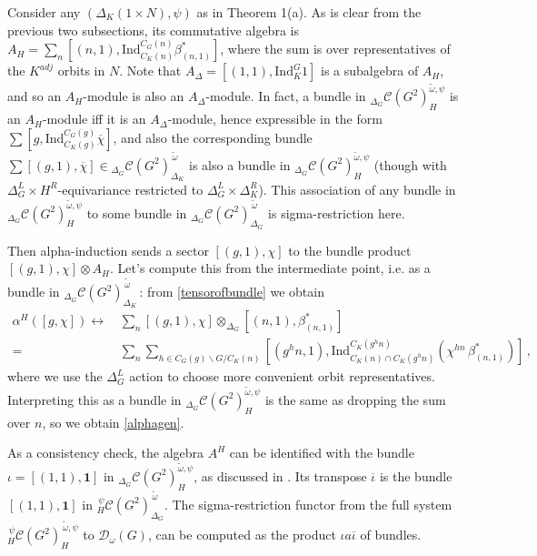 \documentclass[12pt]{article}
\numberwithin{equation}{section}
\def\cC            {{\mathcal{C}}}
\def\cD            {{\mathcal{D}}}
\begin{document}
Consider any $(\Delta_K(1\times N),\psi)$ as in Theorem 1(a). As is clear from the previous two subsections, its commutative algebra is $A_H=\sum_n[(n,1),\mathrm{Ind}_{C_K(n)}^{C_G(n)}\beta^*_{(n,1)}]$, where the sum is over representatives of the $K^{adj}$ orbits in  $N$. Note that $A_\Delta=[(1,1),\mathrm{Ind}_K^G1]$ is a
subalgebra of $A_H$, and so an $A_H$-module is also an $A_\Delta$-module. In fact, a bundle
in ${}_{\Delta_G}\cC(G^2)^{\tilde{\omega},\psi}_H$ is an $A_H$-module iff it is an $A_\Delta$-module, hence expressible in the form $\sum [g,\mathrm{Ind}_{C_K(g)}^{C_G(g)}\overline{\chi}]$,
and also the corresponding bundle $\sum[(g,1),\overline{\chi}]\in{}_{\Delta_G}\cC(G^2)^{\,\tilde{\omega}}_{\Delta_K}$ is also a bundle in ${}_{\Delta_G}\cC(G^2)^{\tilde{\omega},\psi}_H$ (though with $\Delta_G^L\times H^R$-equivariance restricted to $\Delta_G^L\times \Delta_K^R$).
This association of any bundle in ${}_{\Delta_G}\cC(G^2)^{\tilde{\omega},\psi}_H$ to some bundle in ${}_{\Delta_G}\cC(G^2)^{\,\tilde{\omega}}_{\Delta_G}$ is sigma-restriction here.

Then alpha-induction sends a sector $[(g,1),\chi]$ to the bundle product $[(g,1),\chi]\otimes A_H$. Let's compute this from the intermediate point, i.e. as a bundle in ${}_{\Delta_G}\cC(G^2)^{\,\tilde{\omega}}_{\Delta_K}$\,: from \eqref{tensorofbundle} we obtain
\begin{align}\alpha^H([g,\chi])\leftrightarrow&\,\sum_n[(g,1),\chi]\otimes_{\Delta_G}[(n,1),\beta_{(n,1)}^*]\nonumber\\ =&\,\sum_n\sum_{h\in C_G(g)\backslash G/C_K(n)}[(g^hn,1), \mathrm{Ind}_{C_K(n)\cap C_K(g^hn)}^{C_K(g^hn)}(\chi^{hn}\,\beta^*_{(n,1)})]\,,\end{align}
where we use the $\Delta_G^L$ action to choose  more convenient orbit representatives. Interpreting this as a bundle in ${}_{\Delta_G}\cC(G^2)^{\tilde{\omega},\psi}_H$ is the same as dropping the sum over $n$, so we obtain \eqref{alphagen}.


As a consistency check, the algebra $A^H$ can be identified with the bundle
${\iota}=[(1,1),\mathbf{1}]$ in  ${}_{\Delta_G}\cC(G^2)_H^{\tilde{\omega},\psi}$, as discussed in \cite{Ev}. Its transpose $\overline{\iota}$ is the bundle $[(1,1),\mathbf{1}]$ in ${}_H^{\,\psi}\cC(G^2)_{\Delta_G}^{\,\tilde{\omega}}$. The sigma-restriction  functor from the full system ${}_H^{\,\psi}\cC(G^2)_H^{\,\tilde{\omega},\psi}$ to
$\cD_\omega(G)$, can be computed as the product   $\iota a\overline{\iota}$ of bundles. 
\end{document}
